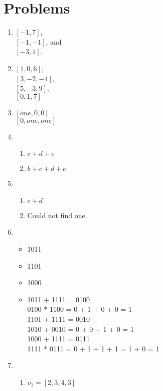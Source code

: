 \documentclass{article}
\begin{document}
    \section{Problems}
    \begin{enumerate}
        \item $[-1, 7]$, \\
            $[-1, -1]$, and \\
            $[-3, 1]$.
        \item $[1,0,6]$, \\
            $[3,-2,-4]$, \\
            $[5,-3,9]$, \\
            $[0,1,7]$
        \item $[one,0,0]$ \\
            $[0,one,one]$
        \item 
            \begin{enumerate}
                \item $c + d + e$
                \item $b + c + d + e$
            \end{enumerate}
        \item 
            \begin{enumerate}
                \item $c + d$
                \item Could not find one.
            \end{enumerate}
        \item 
            \begin{itemize}
                \item 1011
                \item 1101
                \item 1000
                \item 1011 + 1111 = 0100 \\
                    0100 * 1100 = 0 + 1 + 0 + 0 = 1 \\
                    1101 + 1111 = 0010 \\
                    1010 + 0010 = 0 + 0 + 1 + 0 = 1 \\
                    1000 + 1111 = 0111 \\
                    1111 * 0111 = 0 + 1 + 1 + 1 = 1 + 0 = 1
            \end{itemize}
        \item 
            \begin{enumerate} 
                \item $v_1 = [2,3,4,3]$

\end{enumerate}
\end{enumerate}
\end{document}
